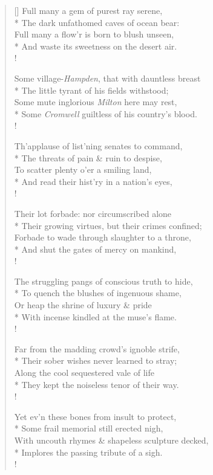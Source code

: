 \documentclass[MAIN]{subfiles}
\begin{document}
\begin{verse}[\versewidth]
Full many a gem of purest ray serene,\\*
The dark unfathomed caves of ocean bear:\\
Full many a flow'r is born to blush unseen,\\*
And waste its sweetness on the desert air.\\!

Some village-\emph{Hampden}, that with dauntless breast\\* 
The little tyrant of his fields withstood;\\
Some mute inglorious \emph{Milton} here may rest,\\*
Some \emph{Cromwell} guiltless of his country's blood.\\!

Th'applause of list'ning senates to command,\\*
The threats of pain \& ruin to despise,\\
To scatter plenty o'er a smiling land,\\*
And read their hist'ry in a nation's eyes,\\!

Their lot forbade: nor circumscribed alone\\*
Their growing virtues, but their crimes confined;\\
Forbade to wade through slaughter to a throne,\\*
And shut the gates of mercy on mankind,\\!

The struggling pangs of conscious truth to hide,\\*
To quench the blushes of ingenuous shame,\\
Or heap the shrine of luxury \& pride\\* 
With incense kindled at the muse's flame.\\!

Far from the madding crowd's ignoble strife,\\*
Their sober wishes never learned to stray;\\
Along the cool sequestered vale of life\\*
They kept the noiseless tenor of their way.\\!

Yet ev'n these bones from insult to protect,\\*
Some frail memorial still erected nigh,\\
With uncouth rhymes \& shapeless sculpture decked,\\*
Implores the passing tribute of a sigh.\\!


\end{verse}
\end{document}
